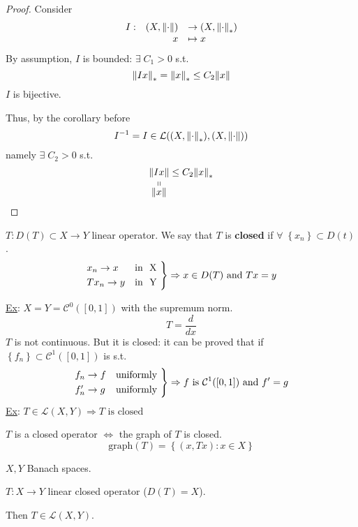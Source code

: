 \begin{proof}
    Consider
    \[
        \begin{array}{lrl}
            I :& (X, \normdot) & \to (X, \normdot_*) \\
            &x & \mapsto x
        \end{array}
    \]
    By assumption, \(I\) is bounded: \(\exists \; C_1 > 0\) s.t. 
    \[
        \norm{Ix}_* = \norm{x}_* \leq C_2 \norm{x}
    \]
    \(I\) is bijective.

    Thus, by the corollary before
    \[
        I^{-1} = I \in \mathcal{L}((X, \normdot_*), (X, \normdot))
    \]
    namely \(\exists \; C_2 > 0\) s.t. 
    \[
        \stackbelow{\norm{Ix}}{\norm{x}} \leq C_2 \norm{x}_*
    \]
\end{proof}
\begin{definition}
    \(T : D(T) \subset X \to Y\) linear operator. We say that \(T\) is \textbf{closed} if \(\forall \; \left\{ x_n \right\} \subset D(t)\). 
    \[
        \begin{rcases*}
            x_n \to x & \mbox{in } X \\
            Tx_n \to y & \mbox{in } Y
        \end{rcases*} \Rightarrow x \in D(T) \mbox{ and } Tx = y
    \]

\end{definition}
\underline{Ex}: \(X = Y = \mathcal{C}^0([0,1])\) with the supremum norm.
\[
    T = \frac{d}{dx}
\]
\(T\) is not continuous. But it is closed: it can be proved that if \(\left\{ f_n \right\} \subset \mathcal{C}^1([0,1])\) is s.t.
\[
    \begin{rcases*}
        f_n \to f & \mbox{uniformly} \\
        f_n' \to g & \mbox{uniformly}
    \end{rcases*} \Rightarrow f \mbox{ is } \mathcal{C}^1([0,1]) \mbox{ and } f' = g
\] 
\underline{Ex}: \(T \in \mathcal{L}(X,Y) \Rightarrow T \mbox{ is closed}\)
\begin{remark}
    \(T\) is a closed operator \(\Leftrightarrow\) the graph of \(T\) is closed.
    \[
        \mbox{graph}(T) = \left\{ (x, Tx): x \in X \right\}
    \]
\end{remark}
\begin{theorem}
    \(X, Y\) Banach spaces. 
    
    \(T : X \to Y\) linear closed operator (\(D(T) = X\)). 
    
    Then \(T \in \mathcal{L}(X,Y)\).
\end{theorem}
